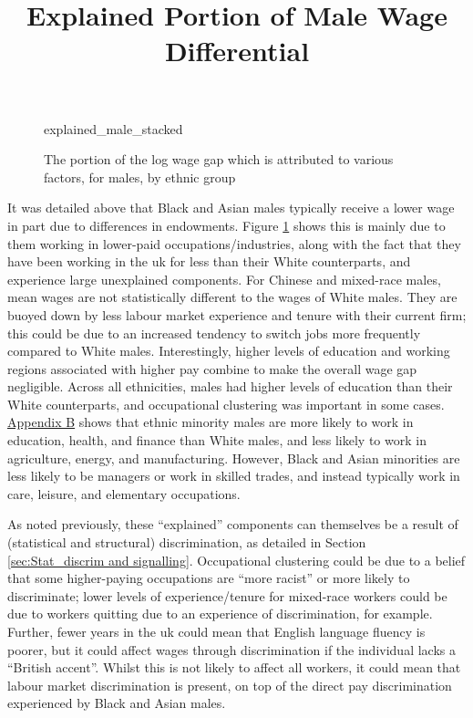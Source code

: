 \documentclass[class=article, crop=false]{standalone}
\begin{document}
\begin{figure}[h]
\centering
    \title{Explained Portion of Male Wage Differential}
    {explained_male_stacked}
    \caption{The portion of the log wage gap which is attributed to various factors, for males, by ethnic group}
    \label{fig:explained_male_stacked}
\end{figure}

It was detailed above that Black and Asian males typically receive a lower wage in part due to differences in endowments. Figure \ref{fig:explained_male_stacked} shows this is mainly due to them working in lower-paid occupations/industries, along with the fact that they have been working in the \acrshort{uk} for less than their White counterparts, and experience large unexplained components. For Chinese and mixed-race males, mean wages are not statistically different to the wages of White males. They are buoyed down by less labour market experience and tenure with their current firm; this could be due to an increased tendency to switch jobs more frequently compared to White males. Interestingly, higher levels of education and working regions associated with higher pay combine to make the overall wage gap negligible. Across all ethnicities, males had higher levels of education than their White counterparts, and occupational clustering was important in some cases. \hyperref[sec:appendixB]{Appendix B} shows that ethnic minority males are more likely to work in education, health, and finance than White males, and less likely to work in agriculture, energy, and manufacturing. However, Black and Asian minorities are less likely to be managers or work in skilled trades, and instead typically work in care, leisure, and elementary occupations.

As noted previously, these \enquote{explained} components can themselves be a result of (statistical and structural) discrimination, as detailed in Section \ref{sec:Stat_discrim and signalling}. Occupational clustering could be due to a belief that some higher-paying occupations are \enquote{more racist} or more likely to discriminate; lower levels of experience/tenure for mixed-race workers could be due to workers quitting due to an experience of discrimination, for example. Further, fewer years in the \acrshort{uk} could mean that English language fluency is poorer, but it could affect wages through discrimination if the individual lacks a \enquote{British accent}. Whilst this is not likely to affect all workers, it could mean that labour market discrimination is present, on top of the direct pay discrimination experienced by Black and Asian males.
\end{document}
